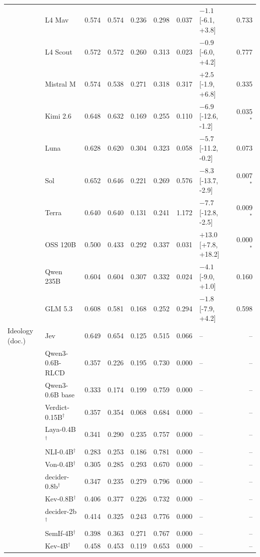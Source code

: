 \begin{longtable}{llrrrrrlr}
 & L4 Mav & 0.574 & 0.574 & 0.236 & 0.298 & 0.037 & $-1.1$ [-6.1, +3.8] & 0.733 \\
 & L4 Scout & 0.572 & 0.572 & 0.260 & 0.313 & 0.023 & $-0.9$ [-6.0, +4.2] & 0.777 \\
 & Mistral M & 0.574 & 0.538 & 0.271 & 0.318 & 0.317 & $+2.5$ [-1.9, +6.8] & 0.335 \\
 & Kimi 2.6 & 0.648 & 0.632 & 0.169 & 0.255 & 0.110 & $-6.9$ [-12.6, -1.2] & 0.035$^{*}$ \\
 & Luna & 0.628 & 0.620 & 0.304 & 0.323 & 0.058 & $-5.7$ [-11.2, -0.2] & 0.073 \\
 & Sol & 0.652 & 0.646 & 0.221 & 0.269 & 0.576 & $-8.3$ [-13.7, -2.9] & 0.007$^{*}$ \\
 & Terra & 0.640 & 0.640 & 0.131 & 0.241 & 1.172 & $-7.7$ [-12.8, -2.5] & 0.009$^{*}$ \\
 & OSS 120B & 0.500 & 0.433 & 0.292 & 0.337 & 0.031 & $+13.0$ [+7.8, +18.2] & 0.000$^{*}$ \\
 & Qwen 235B & 0.604 & 0.604 & 0.307 & 0.332 & 0.024 & $-4.1$ [-9.0, +1.0] & 0.160 \\
 & GLM 5.3 & 0.608 & 0.581 & 0.168 & 0.252 & 0.294 & $-1.8$ [-7.9, +4.2] & 0.598 \\
\midrule
Ideology (doc.) & Jev & 0.649 & 0.654 & 0.125 & 0.515 & 0.066 & -- & -- \\
 & Qwen3-0.6B-RLCD & 0.357 & 0.226 & 0.195 & 0.730 & 0.000 & -- & -- \\
 & Qwen3-0.6B base & 0.333 & 0.174 & 0.199 & 0.759 & 0.000 & -- & -- \\
 & Verdict-0.15B$^{\dagger}$ & 0.357 & 0.354 & 0.068 & 0.684 & 0.000 & -- & -- \\
 & Laya-0.4B$^{\dagger}$ & 0.341 & 0.290 & 0.235 & 0.757 & 0.000 & -- & -- \\
 & NLI-0.4B$^{\dagger}$ & 0.283 & 0.253 & 0.186 & 0.781 & 0.000 & -- & -- \\
 & Von-0.4B$^{\dagger}$ & 0.305 & 0.285 & 0.293 & 0.670 & 0.000 & -- & -- \\
 & decider-0.8b$^{\dagger}$ & 0.347 & 0.235 & 0.279 & 0.796 & 0.000 & -- & -- \\
 & Kev-0.8B$^{\dagger}$ & 0.406 & 0.377 & 0.226 & 0.732 & 0.000 & -- & -- \\
 & decider-2b$^{\dagger}$ & 0.414 & 0.325 & 0.243 & 0.776 & 0.000 & -- & -- \\
 & SemIf-4B$^{\dagger}$ & 0.398 & 0.363 & 0.271 & 0.767 & 0.000 & -- & -- \\
 & Kev-4B$^{\dagger}$ & 0.458 & 0.453 & 0.119 & 0.653 & 0.000 & -- & -- \\

\end{longtable}
